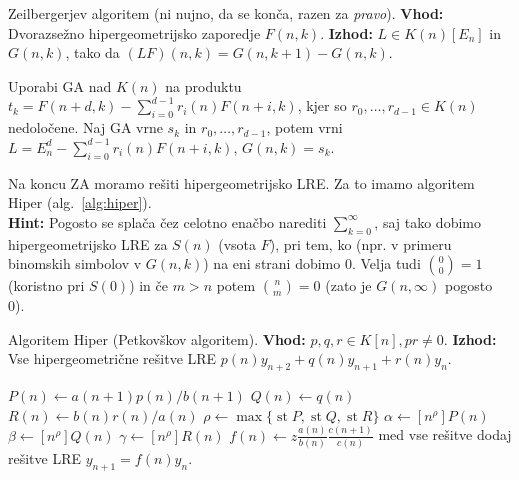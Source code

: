 \documentclass[a4paper,oneside,10pt]{article}
\theoremstyle{definition}
\newcommand{\st}{\operatorname{st}}
\let\oldtextbf\textbf
\renewcommand{\textbf}[1]{\oldtextbf{\boldmath #1}}
\begin{document}
\begin{algorithm}[!ht]
\caption{Zeilbergerjev algoritem (ni nujno, da se konča, razen za \emph{pravo}). \newline
\textbf{Vhod:} Dvorazsežno hipergeometrijsko zaporedje $F(n,k)$. \newline
\textbf{Izhod:} $L \in K(n)[E_n]$ in $G(n, k)$, tako da $(LF)(n, k) = G(n, k+1) - G(n, k)$.}
\label{alg:za}
\begin{algorithmic}[1]
        \State Uporabi GA nad $K(n)$ na produktu $t_k = F(n+d, k) - \sum_{i=0}^{d-1} r_i(n) F(n+i, k)$,
        kjer so $r_0, \ldots, r_{d-1} \in K(n)$ nedoločene.
            \State Naj GA vrne $s_k$ in $r_0, \ldots, r_{d-1}$, potem vrni $L = E_n^d - \sum_{i=0}^{d-1} r_i(n) F(n+i, k)$, $G(n, k) = s_k$.
        \EndIf
    \EndFor
\EndProcedure
\end{algorithmic}
\end{algorithm}

Na koncu ZA moramo rešiti hipergeometrijsko LRE. Za to imamo algoritem Hiper (alg.~\ref{alg:hiper}).\\
\textbf{Hint:} Pogosto se splača čez celotno enačbo narediti $\sum_{k=0}^\infty$, saj tako dobimo hipergeometrijsko LRE za $S(n)$ (vsota $F$), pri tem, ko (npr. v primeru binomskih simbolov v $G(n,k)$) na eni strani dobimo 0. Velja tudi $\binom{0}{0}=1$ (koristno pri $S(0)$) in če $m>n$ potem $\binom{n}{m}=0$ (zato je $G(n,\infty)$ pogosto 0).

\begin{algorithm}[!ht]
\caption{Algoritem Hiper (Petkovškov algoritem). \newline
\textbf{Vhod:} $p, q, r \in K[n], pr \neq 0$. \newline
\textbf{Izhod:} Vse hipergeometrične rešitve LRE $p(n)y_{n+2} + q(n)y_{n+1} + r(n)y_n$.}
\label{alg:hiper}
\begin{algorithmic}[1]
\State $P(n) \gets a(n+1) p(n) / b(n+1)$
\State $Q(n) \gets q(n)$
\State $R(n) \gets b(n) r(n) / a(n)$
\State $\rho \gets \max\{\st P, \st Q, \st R\}$
\State $\alpha \gets [n^\rho]P(n)$
\State $\beta \gets [n^\rho]Q(n)$
\State $\gamma \gets [n^\rho]R(n)$
\State $f(n) \gets z\frac{a(n)}{b(n)} \frac{c(n+1)}{c(n)}$
\State med vse rešitve dodaj rešitve LRE $y_{n+1} = f(n) y_n$.
\EndFor
\EndFor
\EndFor
\EndProcedure
\end{algorithmic}
\end{algorithm}
\end{document}
